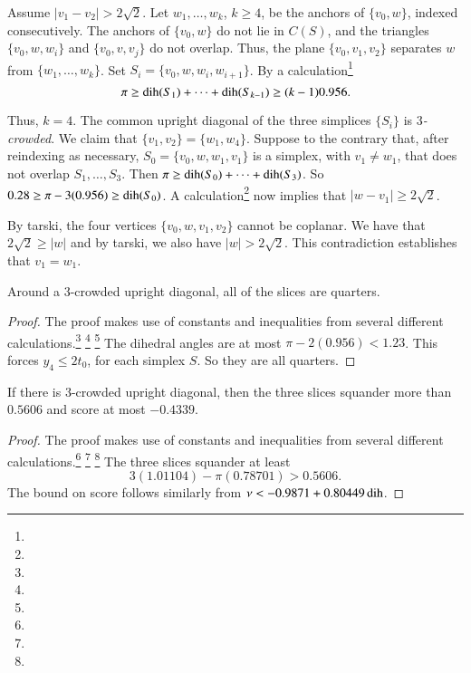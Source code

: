 Assume  $|v_1-v_2|>2\sqrt{2}$. Let $w_1,\ldots,w_k$, $k\ge4$, be the
anchors of $\{v_0,w\}$, indexed consecutively. The anchors of $\{v_0,w\}$ do not
lie in $C(S)$, and the triangles $\{v_0,w,w_i\}$ and $\{v_0,v,v_j\}$ do not
overlap. Thus, the plane $\{v_0,v_1,v_2\}$ separates $w$ from
$\{w_1,\ldots,w_k\}$. Set $S_i=\{v_0,w,w_i,w_{i+1}\}$.
By a calculation\footnote{} %
    $$\pi\ge \operatorname{dih}(S_1)+\cdots+\operatorname{dih}(S_{k-1})\ge (k-1)0.956.$$

Thus, $k=4$. The common upright diagonal  of the three simplices
$\{S_i\}$ is {\it $3$-crowded}.  We claim that
$\{v_1,v_2\}=\{w_1,w_4\}$. Suppose to the contrary that, after
reindexing as necessary, $S_0=\{v_0,w,w_1,v_1\}$ is a simplex, with
$v_1\ne w_1$, that does not overlap $S_1,\ldots,S_3$. Then $\pi\ge
\operatorname{dih}(S_0)+\cdots+\operatorname{dih}(S_3)$. So
    $0.28\ge \pi-3(0.956)\ge \operatorname{dih}(S_0)$.
A calculation\footnote{} %
now implies that $|w-v_1|\ge 2\sqrt{2}$.

By tarski, the four vertices
$\{v_0,w,v_1,v_2\}$ cannot be coplanar.
We have that $2\sqrt{2}\ge|w|$ and by tarski,
we also have $|w|>2\sqrt2$.
This contradiction establishes that $v_1=w_1$.

\begin{lemma}
Around a $3$-crowded upright diagonal, all of the slices
are quarters.
\end{lemma}

\begin{proof}  The proof makes use of constants and inequalities from
several different calculations.\footnote{} %
\footnote{} %
\footnote{} %
The dihedral angles are at most $\pi-
2(0.956) < 1.23$. This forces $y_4\le 2t_0$, for each simplex $S$.
So they are all quarters.
\end{proof}

\begin{lemma}
    \label{lemma:3-crowded}
If there is $3$-crowded upright diagonal, then the three 
slices squander more than $0.5606$ and score at most $-0.4339$.
\end{lemma}


\begin{proof}  The proof makes use of constants and inequalities from
several different calculations.\footnote{} %
\footnote{} %
\footnote{} %
The three slices squander at
least
    $$
    3 (1.01104) - \pi (0.78701) > 0.5606.
    $$
The bound on score follows similarly from $\nu<-0.9871+0.80449\operatorname{dih}$.
\end{proof}

